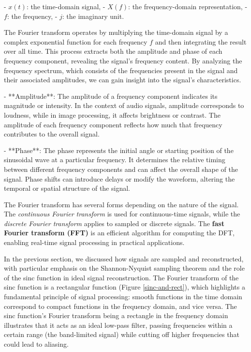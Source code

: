 - \( x(t) \): the time-domain signal,
- \( X(f) \): the frequency-domain representation,
- \( f \): the frequency,
- \( j \): the imaginary unit.

The Fourier transform operates by multiplying the time-domain signal by a complex exponential function for each frequency \( f \) and then integrating the result over all time. This process extracts both the amplitude and phase of each frequency component, revealing the signal's frequency content. By analyzing the frequency spectrum, which consists of the frequencies present in the signal and their associated amplitudes, we can gain insight into the signal's characteristics. 

- **Amplitude**: The amplitude of a frequency component indicates its magnitude or intensity. In the context of audio signals, amplitude corresponds to loudness, while in image processing, it affects brightness or contrast. The amplitude of each frequency component reflects how much that frequency contributes to the overall signal.
  
- **Phase**: The phase represents the initial angle or starting position of the sinusoidal wave at a particular frequency. It determines the relative timing between different frequency components and can affect the overall shape of the signal. Phase shifts can introduce delays or modify the waveform, altering the temporal or spatial structure of the signal.


The Fourier transform has several forms depending on the nature of the signal. The \textit{continuous Fourier transform} is used for continuous-time signals, while the \textit{discrete Fourier transform} applies to sampled or discrete signals. The \textbf{fast Fourier transform (FFT)} is an efficient algorithm for computing the DFT, enabling real-time signal processing in practical applications.

In the previous section, we discussed how signals are sampled and reconstructed, with particular emphasis on the Shannon-Nyquist sampling theorem and the role of the sinc function in ideal signal reconstruction. The Fourier transform of the sinc function is a rectangular function (Figure \ref{sinc-and-rect}), which highlights a fundamental principle of signal processing: smooth functions in the time domain correspond to compact functions in the frequency domain, and vice versa. The sinc function's Fourier transform being a rectangle in the frequency domain illustrates that it acts as an ideal low-pass filter, passing frequencies within a certain range (the band-limited signal) while cutting off higher frequencies that could lead to aliasing.

